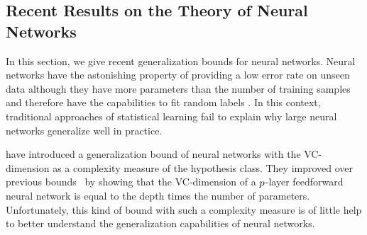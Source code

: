 

\subsection{Recent Results on the Theory of Neural Networks}
\label{subsection:ch2-recent_results_on_the_theory_of_neural_networks}

In this section, we give recent generalization bounds for neural networks.
Neural networks have the astonishing property of providing a low error rate on unseen data although they have more parameters than the number of training samples and therefore have the capabilities to fit random labels \cite{zhang2016understanding}.
In this context, traditional approaches of statistical learning  fail to explain why large neural networks generalize well in practice.

\citet{harvey2017nearly} have introduced a generalization bound of neural networks with the VC-dimension as a complexity measure of the hypothesis class.
They improved over previous bounds~\cite{bartlett1998almost,anthony1999neural} by showing that the VC-dimension of a $p$-layer feedforward neural network is equal to the depth times the number of parameters.
Unfortunately, this kind of bound with such a complexity measure is of little help to better understand the generalization capabilities of neural networks.

